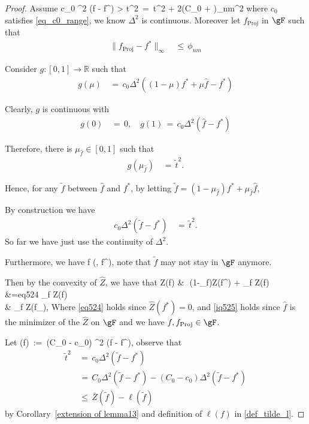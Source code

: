 \documentclass[twoside,11pt]{article}
\begin{document}
\begin{proof}
    Assume 
    \beq \label{tilde_t}
    c_0 \Delta^2 (\hat f - f^\ast) > \tilde t^2 \,=\,  t^2 +  2\left(C_0 + \right)\phi_{nm}^2
    \beq 
    where $c_0$ satisfies \eqref{eq_c0_range}, we know $\Delta^2$ is continuous. Moreover let $f_{\text{Proj}}$ in $\gF$ such that
\begin{align*}
\| f_{\text{Proj}} - f^\ast \|_{\infty} &\,\leq\, \phi_{nm}
\end{align*}

Consider $g: [0,1] \rightarrow \mathbb{R}$ such that
\begin{align*}
g(\mu) &\,=\, c_0\Delta^2 ((1-\mu)f^\ast + \mu\hat f - f^\ast)
\end{align*}

Clearly, $g$ is continuous with
\begin{align*}
g(0) &\,=\, 0, \quad g(1) \,=\, c_0\Delta^2(\hat f - f^\ast)
\end{align*}

Therefore, there is $\mu_{\hat f} \in [0,1]$ such that
\begin{align*}
g(\mu_{\hat f}) &\,=\, \tilde t^2.
\end{align*}

Hence, for any $\tilde f$ between $\hat f$ and $f^\ast$, by letting $\tilde f = (1-\mu_{\hat f})f^\ast + \mu_{\hat f} \hat f$, 

By construction we have
\begin{align*}
c_0 \Delta^2(\tilde f - f^\ast) &\,=\, \tilde t^2. 
\end{align*} So far we have just use the continuity of $\Delta^2$. 

Furthermore, we have 
\bea 
\tilde f \in {}(\gF, f^\ast), 
\bea note that $\tilde f$ may not stay in $\gF$ anymore. 

Then by the convexity of $\hat Z$, we have that
\beq 
\label{eq:star}
\hat Z(\tilde f) &\,\leq\, (1-\mu_{\hat f})\hat Z(f^\ast) + \mu_{\hat f} \hat Z(\hat f)  \\
&={eq524} \mu_{\hat f} \hat Z(\hat f) \\ &  \mu_{\hat f} \hat Z(f_{}), 
\beq 
Where \eqref{eq524} holds since $\hat Z(f^\ast)=0$, and \eqref{iq525} holds since $\hat f$ is the minimizer of the $\hat Z$ on $\gF$ and we have $f, f_{\text{Proj}} \in \gF$.

Let 
\beq
\label{def_tilde_l}
\ell(\tilde f) \,:=\, (C_0 - c_0) \Delta^2 (\tilde f - f^\ast),
\beq observe that
\begin{align*}
\tilde t^2 &\,=\, c_0 \Delta^2 (\tilde f - f^\ast) \\
&\,=\, C_0 \Delta^2 (\tilde f - f^\ast) - (C_0 - c_0)\Delta^2 (\tilde f - f^\ast) \\
&\,\leq\, \bar Z(\tilde f) - \ell(\tilde f)
\end{align*}
by Corollary~\ref{extension of lemma13} and definition of $\ell(f)$ in \eqref{def_tilde_l}. 


\end{proof}
\end{document}
